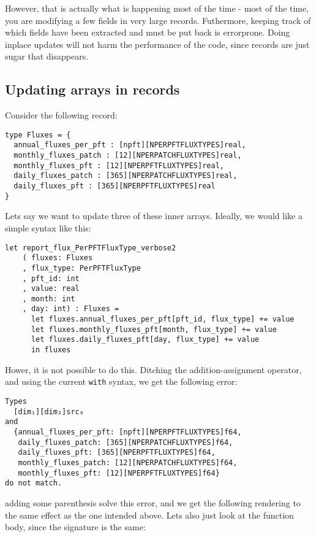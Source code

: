 However, that is actually what is happening most of the time - most of the time, you are modifying a few fields in very large records. Futhermore, keeping track of which fields have been extracted and must be put back is errorprone. Doing inplace updates will not harm the performance of the code, since records are just sugar that disappears.

\subsection{Updating arrays in records}
Consider the following record:

\begin{verbatim}
type Fluxes = {
  annual_fluxes_per_pft : [npft][NPERPFTFLUXTYPES]real,
  monthly_fluxes_patch : [12][NPERPATCHFLUXTYPES]real,
  monthly_fluxes_pft : [12][NPERPFTFLUXTYPES]real,
  daily_fluxes_patch : [365][NPERPATCHFLUXTYPES]real,
  daily_fluxes_pft : [365][NPERPFTFLUXTYPES]real
}
\end{verbatim}

Lets say we want to update three of these inner arrays. Ideally, we would like a simple syntax like this:

\begin{verbatim}
let report_flux_PerPFTFluxType_verbose2
    ( fluxes: Fluxes
    , flux_type: PerPFTFluxType
    , pft_id: int
    , value: real
    , month: int
    , day: int) : Fluxes =
      let fluxes.annual_fluxes_per_pft[pft_id, flux_type] += value
      let fluxes.monthly_fluxes_pft[month, flux_type] += value
      let fluxes.daily_fluxes_pft[day, flux_type] += value
      in fluxes
\end{verbatim}

Hower, it is not possible to do this. Ditching the addition-assignment operator, and using the current \texttt{with} syntax, we get the following error:

\begin{verbatim}
Types
  [dim₁][dim₂]src₀
and
  {annual_fluxes_per_pft: [npft][NPERPFTFLUXTYPES]f64,
   daily_fluxes_patch: [365][NPERPATCHFLUXTYPES]f64,
   daily_fluxes_pft: [365][NPERPFTFLUXTYPES]f64,
   monthly_fluxes_patch: [12][NPERPATCHFLUXTYPES]f64,
   monthly_fluxes_pft: [12][NPERPFTFLUXTYPES]f64}
do not match.
\end{verbatim}

adding some parenthesis solve this error, and we get the following rendering to the same effect as the one intended above. Lets also just look at the function body, since the signature is the same:

